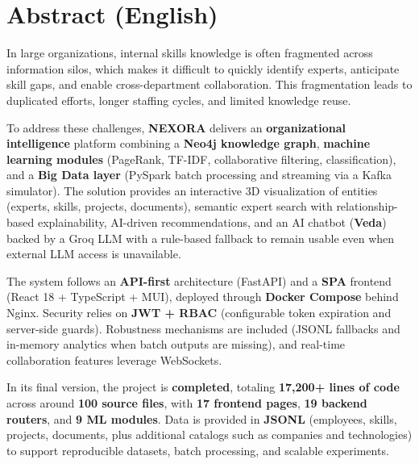 \documentclass[12pt,a4paper]{report}
\begin{document}
\newpage
\section*{Abstract (English)}
In large organizations, internal skills knowledge is often fragmented across information silos, which makes it difficult to quickly identify experts, anticipate skill gaps, and enable cross-department collaboration. This fragmentation leads to duplicated efforts, longer staffing cycles, and limited knowledge reuse.

To address these challenges, \textbf{NEXORA} delivers an \textbf{organizational intelligence} platform combining a \textbf{Neo4j knowledge graph}, \textbf{machine learning modules} (PageRank, TF-IDF, collaborative filtering, classification), and a \textbf{Big Data layer} (PySpark batch processing and streaming via a Kafka simulator). The solution provides an interactive 3D visualization of entities (experts, skills, projects, documents), semantic expert search with relationship-based explainability, AI-driven recommendations, and an AI chatbot (\textbf{Veda}) backed by a Groq LLM with a rule-based fallback to remain usable even when external LLM access is unavailable.

The system follows an \textbf{API-first} architecture (FastAPI) and a \textbf{SPA} frontend (React 18 + TypeScript + MUI), deployed through \textbf{Docker Compose} behind Nginx. Security relies on \textbf{JWT + RBAC} (configurable token expiration and server-side guards). Robustness mechanisms are included (JSONL fallbacks and in-memory analytics when batch outputs are missing), and real-time collaboration features leverage WebSockets.

In its final version, the project is \textbf{completed}, totaling \textbf{17,200+ lines of code} across around \textbf{100 source files}, with \textbf{17 frontend pages}, \textbf{19 backend routers}, and \textbf{9 ML modules}. Data is provided in \textbf{JSONL} (employees, skills, projects, documents, plus additional catalogs such as companies and technologies) to support reproducible datasets, batch processing, and scalable experiments.

\clearpage
\tableofcontents
\clearpage
\listoffigures
\newpage
\listoftables
\newpage


\end{document}
